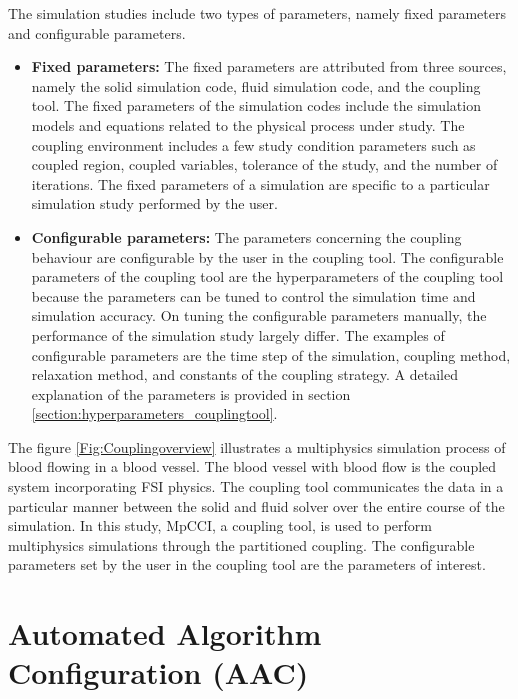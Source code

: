  The simulation studies include two types of parameters, namely fixed parameters and configurable parameters.
 
 \begin{itemize}
     \item \textbf{Fixed parameters:} The fixed parameters are attributed from three sources, namely the solid simulation code, fluid simulation code, and the coupling tool. The fixed parameters of the simulation codes include the simulation models and equations related to the physical process under study. The coupling environment includes a few study condition parameters such as coupled region, coupled variables, tolerance of the study, and the number of iterations. The fixed parameters of a simulation are specific to a particular simulation study performed by the user.
     
     \item \textbf{Configurable parameters:} The parameters concerning the coupling behaviour are configurable by the user in the coupling tool. The configurable parameters of the coupling tool are the hyperparameters of the coupling tool because the parameters can be tuned to control the simulation time and simulation accuracy. On tuning the configurable parameters manually, the performance of the simulation study largely differ. The examples of configurable parameters are the time step of the simulation, coupling method, relaxation method, and constants of the coupling strategy. A detailed explanation of the parameters is provided in section \ref{section:hyperparameters_couplingtool}.
 \end{itemize}
 
The figure \ref{Fig:Couplingoverview} illustrates a multiphysics simulation process of blood flowing in a blood vessel. The blood vessel with blood flow is the coupled system incorporating FSI physics. The coupling tool communicates the data in a particular manner between the solid and fluid solver over the entire course of the simulation. In this study, MpCCI, a coupling tool, is used to perform multiphysics simulations through the partitioned coupling. The configurable parameters set by the user in the coupling tool are the parameters of interest. 


\section{Automated Algorithm Configuration (AAC)}

